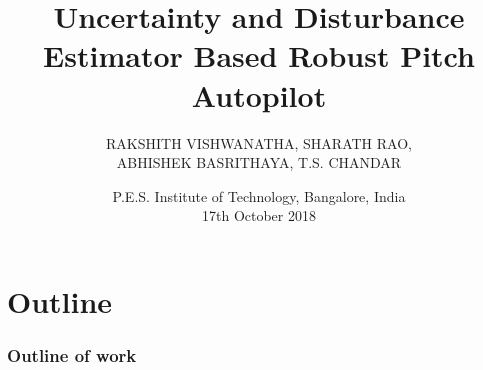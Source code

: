 \documentclass[table,10pt,red]{beamer}	%
\title
[
Uncertainty and Disturbance Estimator Based Robust Pitch Autopilot	%
]
{
	Uncertainty and Disturbance Estimator Based Robust Pitch Autopilot
}
\author
[
]
{
	RAKSHITH VISHWANATHA, SHARATH RAO, \\ABHISHEK BASRITHAYA, T.S. CHANDAR \\
}
\date
{
P.E.S. Institute of Technology, Bangalore, India \\ 17th October 2018	%
}
\begin{document}

\begin{frame}	%
	\titlepage %
\end{frame}
\section*{Outline}
\begin{frame}
	\frametitle{Outline of work} %
	\tableofcontents %
\end{frame}
\end{document}
